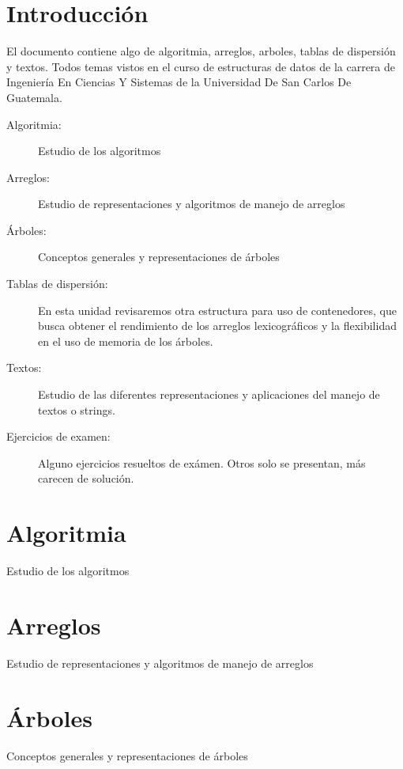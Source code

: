 \documentclass[10pt,letterpaper,]{book}
\author{\autor \\ \correo}
\title{\titulo}
\date{}
\begin{document}
\maketitle
\thispagestyle{empty}

\frontmatter
\chapter{Introducción}
El documento contiene algo de algoritmia, arreglos, arboles, tablas de
dispersión y textos. Todos temas vistos en el curso de estructuras de
datos de la carrera de Ingeniería En Ciencias Y Sistemas de la
Universidad De San Carlos De Guatemala.

\begin{description}
\item[Algoritmia: ] Estudio de los algoritmos
\item[Arreglos: ] Estudio de representaciones y algoritmos de manejo
  de arreglos
\item[Árboles: ] Conceptos generales y representaciones de árboles
\item[Tablas de dispersión: ] En esta unidad revisaremos otra
  estructura para uso de contenedores, que busca obtener el
  rendimiento de los arreglos lexicográficos y la flexibilidad en el
  uso de memoria de los árboles.
\item[Textos: ] Estudio de las diferentes representaciones y
  aplicaciones del manejo de textos o strings.
\item[Ejercicios de examen: ] Alguno ejercicios resueltos de
  exámen. Otros solo se presentan, más carecen de solución.
\end{description}

\let\cleardoublepage\clearpage

\mainmatter
\chapter{Algoritmia}
\label{cha:algoritmia}
Estudio de los algoritmos



\chapter{Arreglos}
\label{cha:arreglos}
Estudio de representaciones y algoritmos de manejo de arreglos



\chapter{Árboles}
\label{cha:arboles}
Conceptos generales y representaciones de árboles

\end{document}
